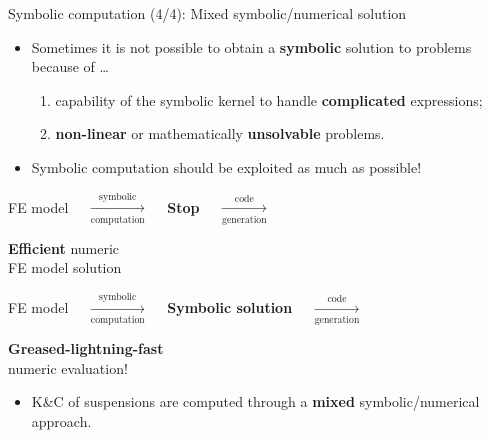 \begin{frame}{Symbolic computation (4/4): Mixed symbolic/numerical solution}
  \begin{itemize}
    \item Sometimes it is not possible to obtain a \textbf{symbolic} solution to problems because of \dots \\[0.5em]
    \begin{enumerate}
      \item capability of the symbolic kernel to handle \textbf{complicated} expressions; \\[0.5em]
      \item \textbf{non-linear} or mathematically \textbf{unsolvable} problems. \\[1.0em]
    \end{enumerate}
    \item Symbolic computation should be exploited as much as possible! \\[0.5em]
  \end{itemize}
  \begin{center}\begin{minipage}{13.1cm}\begin{block}{}
    \centering
    FE model $\quad \xrightarrow[\text{computation}]{\text{symbolic}} \quad$ \hspace*{1.05cm}\textcolor{mycolor2}{\textbf{Stop}}\hspace*{1.05cm} $\quad \xrightarrow[\text{generation}]{\text{code}} \quad$ \begin{minipage}[c]{0.27\linewidth}\begin{center}{\textbf{Efficient} numeric \\ FE model solution}\end{center}\end{minipage}
  \end{block}\end{minipage}\end{center}
  \begin{center}\begin{minipage}{13.1cm}\begin{block}{}
    \centering
    FE model $\quad \xrightarrow[\text{computation}]{\text{symbolic}} \quad$ \textcolor{mycolor5}{\textbf{Symbolic solution}} $\quad \xrightarrow[\text{generation}] {\text{code}} \quad$ \begin{minipage}[c]{0.27\linewidth}\begin{center}{\textbf{Greased-lightning-fast} \\ numeric evaluation!}\end{center}\end{minipage}
  \end{block}\end{minipage}\end{center}
  \begin{itemize}
    \item K\&C of suspensions are computed through a \textbf{mixed} symbolic/numerical approach.
  \end{itemize}
\end{frame}

